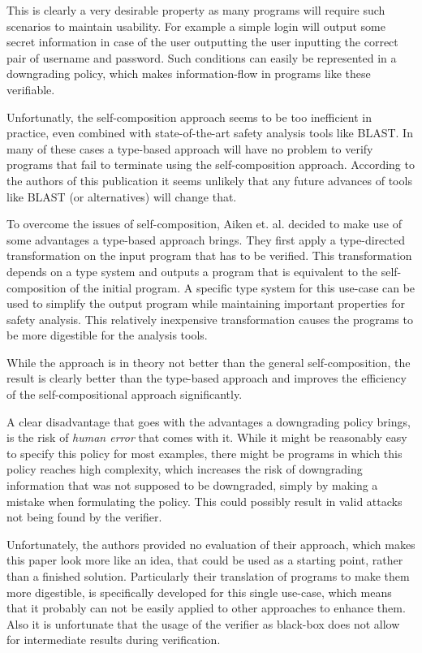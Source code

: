 \documentclass[a4paper,UKenglish]{lipics-v2018}
\begin{document}
This is clearly a very desirable property as many programs will require such scenarios to maintain usability. For example a simple login will output some secret information in case of the user outputting the user inputting the correct pair of username and password. Such conditions can easily be represented in a downgrading policy, which makes information-flow in programs like these verifiable.\cite{secure_information_flow_safety}

Unfortunatly, the self-composition approach seems to be too inefficient in practice, even combined with state-of-the-art safety analysis tools like BLAST. In many of these cases a type-based approach will have no problem to verify programs that fail to terminate using the self-composition approach. According to the authors of this publication it seems unlikely that any future advances of tools like BLAST (or alternatives) will change that.\cite{secure_information_flow_safety}

To overcome the issues of self-composition, Aiken et. al. decided to make use of some advantages a type-based approach brings. They first apply a type-directed transformation on the input program that has to be verified. This transformation depends on a type system and outputs a program that is equivalent to the self-composition of the initial program. A specific type system for this use-case can be used to simplify the output program while maintaining important properties for safety analysis. This relatively inexpensive transformation causes the programs to be more digestible for the analysis tools. 
\cite{secure_information_flow_safety}

While the approach is in theory not better than the general self-composition, the result is clearly better than the type-based approach and improves the efficiency of the self-compositional approach significantly.
\cite{secure_information_flow_safety}

A clear disadvantage that goes with the advantages a downgrading policy brings, is the risk of \textit{human error} that comes with it. While it might be reasonably easy to specify this policy for most examples, there might be programs in which this policy reaches high complexity, which increases the risk of downgrading information that was not supposed to be downgraded, simply by making a mistake when formulating the policy. This could possibly result in valid attacks not being found by the verifier.

Unfortunately, the authors provided no evaluation of their approach, which makes this paper look more like an idea, that could be used as a starting point, rather than a finished solution. Particularly their translation of programs to make them more digestible, is specifically developed for this single use-case, which means that it probably can not be easily applied to other approaches to enhance them. Also it is unfortunate that the usage of the verifier as black-box does not allow for intermediate results during verification.
\end{document}
